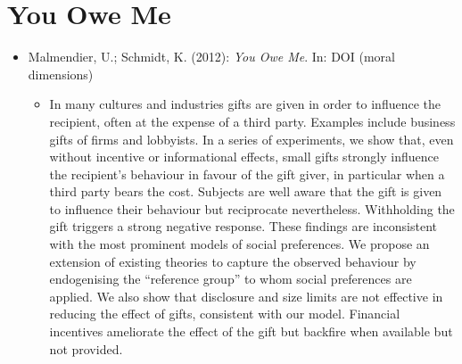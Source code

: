 \section{You Owe Me}
\begin{itemize}
	\item Malmendier, U.; Schmidt, K. (2012): \textit{You Owe Me}. In: DOI (moral dimensions)
		\begin{itemize}
			\item In many cultures and industries gifts are given in order to influence the recipient, often at the expense of a third party. Examples include business gifts of firms and lobbyists. In a series of experiments, we show that, even without incentive or informational effects, small gifts strongly influence the recipient’s behaviour in favour of the gift giver, in particular when a third party bears the cost. Subjects are well aware that the gift is given to influence their behaviour but reciprocate nevertheless. Withholding the gift triggers a strong negative response. These findings are inconsistent with the most prominent models of social preferences. We propose an extension of existing theories to capture the observed behaviour by endogenising the “reference group” to whom social preferences are applied. We also show that disclosure and size limits are not effective in reducing the effect of gifts, consistent with our model. Financial incentives ameliorate the effect of the gift but backfire when available but not provided.
		\end{itemize}
\end{itemize}


